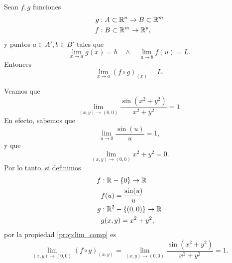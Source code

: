 \begin{propertie}  \label{prop:lim_comp}
\mbox{}

Sean $f, g$ funciones 
\begin{align*}
 g &:A \subset \mathbb{R}^n \to B \subset \mathbb{R}^m \\
 f &:B \subset \mathbb{R}^m \to \mathbb{R}^p,
\end{align*}
y puntos $a \in A', b \in B'$ tales que 
\[
 \lim_{x \to a} g(x) = b \quad \wedge \quad \lim_{u \to b} f(u) = L.
\]
Entonces
\[
 \lim_{x \to a} \left( f \circ g \right)_{(x)} = L.
\]
\end{propertie}
\begin{example}
 Veamos que 
 \[
  \lim_{(x,y) \to (0,0)} \frac{\sin(x^2 + y^2)}{x^2 + y^2} = 1.
 \]
 En efecto, sabemos que 
  \[
    \lim_{u \to 0} \frac{\sin(u)}{u} = 1,
  \]
  y que
  \[
    \lim_{(x,y) \to (0,0)} x^2 + y^2 = 0.
  \]  
  Por lo tanto, si definimos 
  \begin{align*}
   f&: \mathbb{R} - \{0\} \to \mathbb{R} \\
    &f(u) = \frac{\sin(u)}{u} \\
   g&: \mathbb{R}^2 - \{(0,0)\} \to \mathbb{R} \\
    &g(x,y) = x^2 + y^2,
  \end{align*}
  por la propiedad \eqref{prop:lim_comp} es
  \[
   \lim_{(x,y) \to (0,0)} \left( f \circ g \right)_{(x,y)} = 
   \lim_{(x,y) \to (0,0)} \frac{\sin(x^2 + y^2)}{x^2 + y^2} = 1.
  \]
\end{example}

